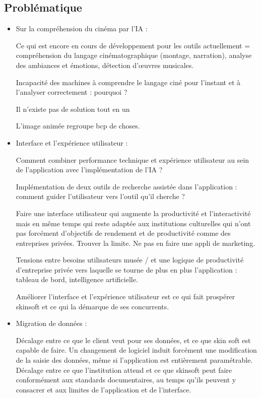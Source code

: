 \subsection{Problématique}

\begin{itemize}
	\item Sur la compréhension du cinéma par l’IA :  
	
	Ce qui est encore en cours de développement pour les outils actuellement = compréhension du langage cinématographique (montage, narration), analyse des ambiances et émotions, détection d’œuvres musicales. 
	
	Incapacité des machines à comprendre le langage ciné pour l’instant et à l’analyser correctement : pourquoi ?  
	
	Il n’existe pas de solution tout en un  
	
	L'image animée regroupe bcp de choses.
	
	  
	
	\item Interface et l’expérience utilisateur :  
	
	Comment combiner performance technique et expérience utilisateur au sein de l’application avec l’implémentation de l’IA ? 
	
	Implémentation de deux outils de recherche assistée dans l’application : comment guider l’utilisateur vers l’outil qu’il cherche ?  
	
	Faire une interface utilisateur qui augmente la productivité et l’interactivité mais en même temps qui reste adaptée aux institutions culturelles qui n’ont pas forcément d’objectifs de rendement et de productivité comme des entreprises privées. Trouver la limite. Ne pas en faire une appli de marketing.  
	
	Tensions entre besoins utilisateurs musée / et une logique de productivité d’entreprise privée vers laquelle se tourne de plus en plus l’application : tableau de bord, intelligence artificielle.  
	
	Améliorer l’interface et l’expérience utilisateur est ce qui fait prospérer skinsoft et ce qui la démarque de ses concurrents.  
	
	
	\item Migration de données :  
	
	Décalage entre ce que le client veut pour ses données, et ce que skin soft est capable de faire. Un changement de logiciel induit forcément une modification de la saisie des données, même si l’application est entièrement paramétrable. Décalage entre ce que l’institution attend et ce que skinsoft peut faire conformément aux standards documentaires, au temps qu’ils peuvent y consacrer et aux limites de l’application et de l’interface.  
	

\end{itemize}
